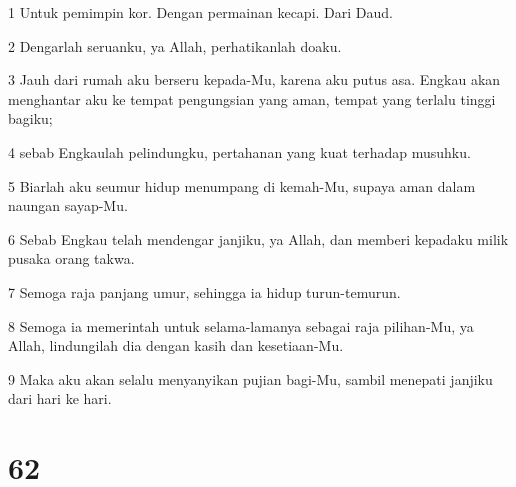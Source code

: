 \par 1 Untuk pemimpin kor. Dengan permainan kecapi. Dari Daud.
\par 2 Dengarlah seruanku, ya Allah, perhatikanlah doaku.
\par 3 Jauh dari rumah aku berseru kepada-Mu, karena aku putus asa. Engkau akan menghantar aku ke tempat pengungsian yang aman, tempat yang terlalu tinggi bagiku;
\par 4 sebab Engkaulah pelindungku, pertahanan yang kuat terhadap musuhku.
\par 5 Biarlah aku seumur hidup menumpang di kemah-Mu, supaya aman dalam naungan sayap-Mu.
\par 6 Sebab Engkau telah mendengar janjiku, ya Allah, dan memberi kepadaku milik pusaka orang takwa.
\par 7 Semoga raja panjang umur, sehingga ia hidup turun-temurun.
\par 8 Semoga ia memerintah untuk selama-lamanya sebagai raja pilihan-Mu, ya Allah, lindungilah dia dengan kasih dan kesetiaan-Mu.
\par 9 Maka aku akan selalu menyanyikan pujian bagi-Mu, sambil menepati janjiku dari hari ke hari.

\chapter{62}

